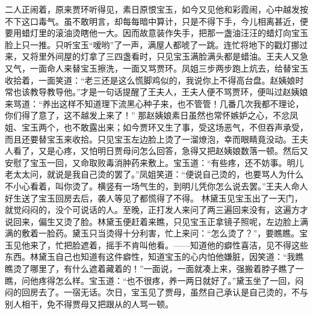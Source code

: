 \documentclass[12pt,oneside]{book}
\begin{document}
二人正闹着，原来贾环听得见，素日原恨宝玉，如今又见他和彩霞闹，心中越发按不下这口毒气。虽不敢明言，却每每暗中算计，只是不得下手，今儿相离甚近，便要用蜡灯里的滚油烫瞎他一大。因而故意装作失手，把那一盏油汪汪的蜡灯向宝玉脸上只一推。只听宝玉“嗳哟”了一声，满屋人都唬了一跳。连忙将地下的戳灯挪过来，又将里外间屋的灯拿了三四盏看时，只见宝玉满脸满头都是蜡油。王夫人又急又气，一面命人来替宝玉擦洗，一面又骂贾环。凤姐三步两步跑上炕去，给替宝玉收拾着，一面笑道：“老三还是这么慌脚鸡似的，我说你上不得高台盘。赵姨娘时常也该教导教导他。”才是一句话提醒了王夫人，王夫人便不骂贾环，便叫过赵姨娘来骂道：“养出这样不知道理下流黑心种子来，也不管管！几番几次我都不理论，你们得了意了，这不越发上来了！”
那赵姨娘素日虽然也常怀嫉妒之心，不忿凤姐、宝玉两个，也不敢露出来；如今贾环又生了事，受这场恶气，不但吞声承受，而且还要替宝玉来收拾。只见宝玉左边脸上烫了一溜燎泡，幸而眼睛竟没动。王夫人看了，又是心疼，又怕明日贾母问怎么回答，急得又把赵姨娘数落一顿。然后又安慰了宝玉一回，又命取败毒消肿药来敷上。宝玉道：“有些疼，还不妨事。明儿老太太问，就说是我自己烫的罢了。”凤姐笑道：“便说自己烫的，也要骂人为什么不小心看着，叫你烫了。横竖有一场气生的，到明儿凭你怎么说去罢。”王夫人命人好生送了宝玉回房去后，袭人等见了都慌得了不得。
林黛玉见宝玉出了一天门，就觉闷闷的，没个可说话的人。至晚，正打发人来问了两三遍回来没有，这遍方才说回来，偏生又烫了脸。林黛玉便赶着来瞧，只见宝玉正拿镜子照呢，左边脸上满满的敷着一脸药。黛玉只当烫得十分利害，忙上来问：“怎么烫了？”，要瞧瞧。宝玉见他来了，忙把脸遮着，摇手不肯叫他看。——知道他的癖性喜洁，见不得这些东西。林黛玉自己也知道有这件癖性，知道宝玉的心内怕他嫌脏，因笑道：“我瞧瞧烫了哪里了，有什么遮着藏着的！”一面说，一面就凑上来，强搬着脖子瞧了一瞧，问他疼得怎么样。宝玉道：“也不很疼，养一两日就好了。”黛玉坐了一回，闷闷的回房去了。一宿无话。次日，宝玉见了贾母，虽然自己承认是自己烫的，不与别人相干，免不得贾母又把跟从的人骂一顿。
\end{document}
